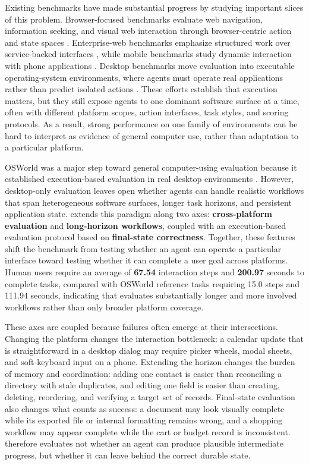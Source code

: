 Existing benchmarks have made substantial progress by studying important slices of this problem. Browser-focused benchmarks evaluate web navigation, information seeking, and visual web interaction through browser-centric action and state spaces \citep{zhou2023webarena,koh2024visualwebarena,deng2023mind2web,he2024webvoyager,sun2025genesis,gou2026mindweb}. Enterprise-web benchmarks emphasize structured work over service-backed interfaces \citep{drouin2024workarena}, while mobile benchmarks study dynamic interaction with phone applications \citep{rawles2024androidworld,sun2025sentinel,cheng2026openmobile}. Desktop benchmarks move evaluation into executable operating-system environments, where agents must operate real applications rather than predict isolated actions \citep{xie2024osworld,bonatti2024windows}. These efforts establish that execution matters, but they still expose agents to one dominant software surface at a time, often with different platform scopes, action interfaces, task styles, and scoring protocols. As a result, strong performance on one family of environments can be hard to interpret as evidence of general computer use, rather than adaptation to a particular platform.

OSWorld was a major step toward general computer-using evaluation because it established execution-based evaluation in real desktop environments \citep{xie2024osworld}. However, desktop-only evaluation leaves open whether agents can handle realistic workflows that span heterogeneous software surfaces, longer task horizons, and persistent application state. \dataset extends this paradigm along two axes: \textbf{cross-platform evaluation} and \textbf{long-horizon workflows}, coupled with an execution-based evaluation protocol based on \textbf{final-state correctness}. Together, these features shift the benchmark from testing whether an agent can operate a particular interface toward testing whether it can complete a user goal across platforms. Human users require an average of \textbf{67.54} interaction steps and \textbf{200.97} seconds to complete \dataset tasks, compared with OSWorld reference tasks requiring 15.0 steps and 111.94 seconds, indicating that \dataset evaluates substantially longer and more involved workflows rather than only broader platform coverage.

These axes are coupled because failures often emerge at their intersections. Changing the platform changes the interaction bottleneck: a calendar update that is straightforward in a desktop dialog may require picker wheels, modal sheets, and soft-keyboard input on a phone. Extending the horizon changes the burden of memory and coordination: adding one contact is easier than reconciling a directory with stale duplicates, and editing one field is easier than creating, deleting, reordering, and verifying a target set of records. Final-state evaluation also changes what counts as success: a document may look visually complete while its exported file or internal formatting remains wrong, and a shopping workflow may appear complete while the cart or budget record is inconsistent. \dataset therefore evaluates not whether an agent can produce plausible intermediate progress, but whether it can leave behind the correct durable state.



